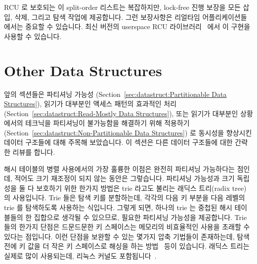 RCU 로 보호되는 이 split-order 리스트는 복잡하지만, lock-free 진행 보장을 모든
삽입, 삭제, 그리고 탐색 작업에 제공합니다.
그런 보장사항은 리얼타임 어플리케이션들에서는 중요할 수 있습니다.
최신 버전의 userspace RCU 라이브러리~\cite{MathieuDesnoyers2009URCU} 에서 이
구현을 사용할 수 있습니다.

\section{Other Data Structures}
\label{sec:datastruct:Other Data Structures}

앞의 섹션들은 파티셔닝 가능성
(Section~\ref{sec:datastruct:Partitionable Data Structures}),
읽기가 대부분인 액세스 패턴의 효과적인 처리
(Section~\ref{sec:datastruct:Read-Mostly Data Structures}),
또는 읽기가 대부분인 상황에서의 테크닉을 파티셔닝이 불가능함을 해결하기 위해 적용하기
(Section~\ref{sec:datastruct:Non-Partitionable Data Structures})
로 동시성을 향상시킨 데이터 구조들에 대해 주목해 보았습니다.
이 섹션은 다른 데이터 구조들에 대한 간략한 리뷰를 합니다.

해시 테이블의 병렬 사용에서의 가장 훌륭한 이점은 완전히 파티셔닝 가능하다는
점인데, 적어도 크기 재조정이 되지 않는 동안은 그렇습니다.
파티셔닝 가능성과 크기 독립성을 둘 다 보호하기 위한 한가지 방법은 trie 라고도
불리는 래딕스 트리(radix tree) 의 사용입니다.
Trie 들은 탐색 키를 분할하는데, 각각의 다음 키 부분을 다음 레벨의 trie 를
탐색하도록 사용하는 식입니다.
그렇게 되면, 하나의 trie 는 중첩된 해시 테이블들의 한 집합으로 생각될 수
있으므로, 필요한 파티셔닝 가능성을 제공합니다.
Trie 들의 한가지 단점은 드문드문한 키 스페이스는 메모리의 비효율적인 사용을
초래할 수 있다는 점입니다.
이런 단점을 보완할 수 있는 몇가지 압축 기법들이 존재하는데, 탐색 전에 키 값을
더 작은 키 스페이스로 해싱을 하는 방법~\cite{RobertOlsson2006a} 등이 있습니다.
래딕스 트리는 실제로 많이 사용되는데, 리눅스 커널도
포함됩니다~\cite{NickPiggin2006radixtree}.
\iffalse

